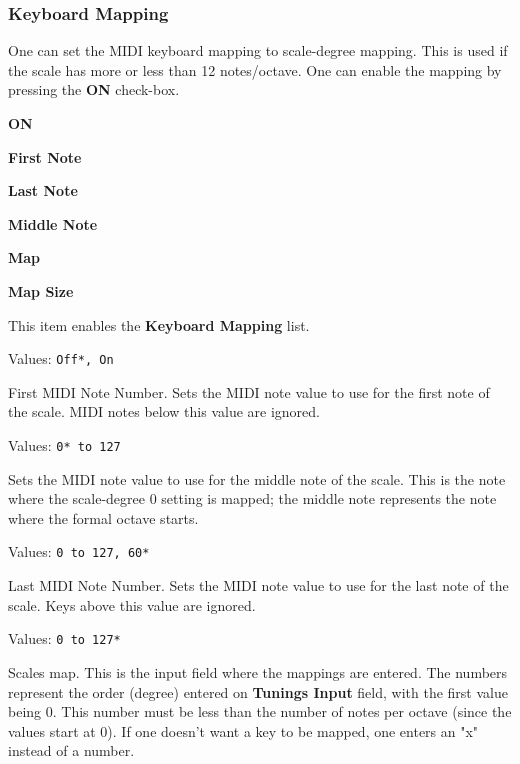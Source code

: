 \subsubsection{Keyboard Mapping}
\label{subsubsec:scales_keyboard_mapping}

   One can set the MIDI keyboard mapping to scale-degree mapping.
   This is used if the scale has more or less than 12 notes/octave.
   One can enable the mapping by pressing the \textbf{ON} check-box.

   \begin{enumber}
      \item \textbf{ON}
      \item \textbf{First Note}
      \item \textbf{Last Note}
      \item \textbf{Middle Note}
      \item \textbf{Map}
      \item \textbf{Map Size}
   \end{enumber}

   \setcounter{ItemCounter}{0}      %

   This item enables the \textbf{Keyboard Mapping} list.

   Values: \texttt{Off*, On}

   First MIDI Note Number.
   Sets the MIDI note value to use for the first note of the scale.
   MIDI notes below this value are ignored.

   Values: \texttt{0* to 127}

   Sets the MIDI note value to use for the middle note of the scale.
   This is the note where the scale-degree 0 setting is mapped;
   the middle note represents the note where the formal octave starts.

   Values: \texttt{0 to 127, 60*}

   Last MIDI Note Number.
   Sets the MIDI note value to use for the last note of the scale.
   Keys above this value are ignored.

   Values: \texttt{0 to 127*}

   Scales map.  This is the input field where the mappings are entered.
   The numbers represent the order (degree) entered on
   \textbf{Tunings Input} field, with the first value being 0.
   This number must be less than the number of notes per octave (since
   the values start at 0).
   If one doesn't want a key to be mapped, one enters an "x" instead of a
   number.

